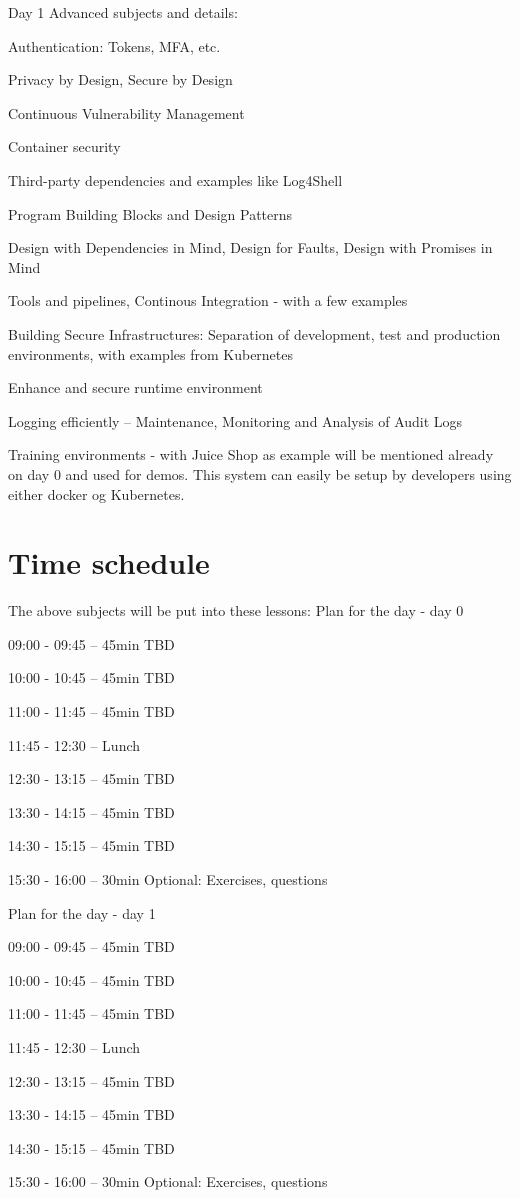 \documentclass[a4paper,11pt,notitlepage]{report}
\begin{document}
Day 1 Advanced subjects and details:
\begin{list2}
\item Authentication: Tokens, MFA, etc.
\item Privacy by Design, Secure by Design
\item Continuous Vulnerability Management
\item Container security
\item Third-party dependencies and examples like Log4Shell
\item Program Building Blocks and Design Patterns
\item Design with Dependencies in Mind, Design for Faults, Design with Promises in Mind
\item Tools and pipelines, Continous Integration - with a few examples
\item Building Secure Infrastructures:
Separation of development, test and production environments, with examples from Kubernetes
\item Enhance and secure runtime environment
\item Logging efficiently -- Maintenance, Monitoring and Analysis of Audit Logs
\end{list2}

Training environments - with Juice Shop as example will be mentioned already on  day 0 and used for demos. This system can easily be setup by developers using either docker og Kubernetes.


\section*{Time schedule}

The above subjects will be put into these lessons:
Plan for the day - day 0
\begin{list2}
\item 09:00 - 09:45 -- 45min TBD
\item 10:00 - 10:45 -- 45min TBD
\item 11:00 - 11:45 -- 45min TBD
\item 11:45 - 12:30 -- Lunch
\item 12:30 - 13:15 -- 45min TBD
\item 13:30 - 14:15 -- 45min TBD
\item 14:30 - 15:15 -- 45min TBD
\item 15:30 - 16:00 -- 30min Optional: Exercises, questions
\end{list2}

Plan for the day - day 1
\begin{list2}
\item 09:00 - 09:45 -- 45min TBD
\item 10:00 - 10:45 -- 45min TBD
\item 11:00 - 11:45 -- 45min TBD
\item 11:45 - 12:30 -- Lunch
\item 12:30 - 13:15 -- 45min TBD
\item 13:30 - 14:15 -- 45min TBD
\item 14:30 - 15:15 -- 45min TBD
\item 15:30 - 16:00 -- 30min Optional: Exercises, questions
\end{list2}
\end{document}
